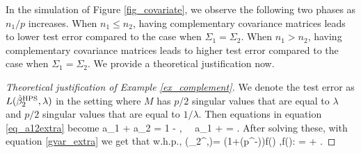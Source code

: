 \iffalse
In the simulation of Figure \ref{fig_covariate}, we observe the following two phases as  $n_1 / p$ increases.
When $n_1 \le n_2$, having complementary covariance matrices leads to lower test error compared to the case when $\Sigma_1 = \Sigma_2$.
When $n_1 > n_2$, having complementary covariance matrices leads to higher test error compared to the case when $\Sigma_1 = \Sigma_2$.
We provide a theoretical justification now.

\begin{proof}[Theoretical justification of Example \ref{ex_complement}]
We denote the test error as $L(\hat \beta_{2}^{\textup{HPS}},\lambda)$ in the setting where $M$ has $p/2$ singular values that are equal to $\lambda$ and $p/2$ singular values that are equal to $1 / \lambda$. Then equations in equation \eqref{eq_a12extra} become
\be\label{compleeq} a_1 + a_2 = 1 - ,  \ \ a_1 + \cdot {} = . \ee
After solving these, with equation \eqref{gvar_extra} we get that w.h.p.,
\be\label{testcomple}
 \te(\hat \beta_{2}^{\MTL},\lambda)= (1+\OO(p^{-\e}))\cdot f(\lambda) ,\quad f(\lambda): =  + .\ee



\end{proof}
